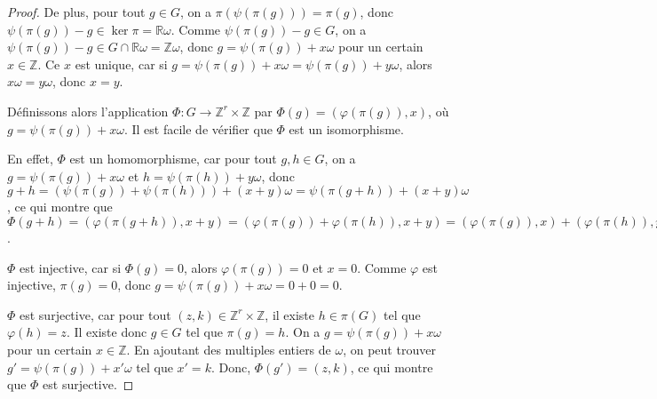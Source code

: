 \documentclass{article}
\newcommand{\R}{\mathbb{R}}
\newcommand{\Z}{\mathbb{Z}}
\begin{document}
\begin{proof}
De plus, pour tout $g \in G$, on a $\pi(\psi(\pi(g))) = \pi(g)$, donc $\psi(\pi(g)) - g \in \ker \pi = \R \omega$. Comme $\psi(\pi(g)) - g \in G$, on a $\psi(\pi(g)) - g \in G \cap \R \omega = \Z \omega$, donc $g = \psi(\pi(g)) + x \omega$ pour un certain $x \in \Z$. Ce $x$ est unique, car si $g = \psi(\pi(g)) + x \omega = \psi(\pi(g)) + y \omega$, alors $x\omega = y\omega$, donc $x = y$.

Définissons alors l'application \( \Phi \colon G \to \Z^r \times \Z \) par \( \Phi(g) = (\varphi(\pi(g)), x) \), où \( g = \psi(\pi(g)) + x \omega \). Il est facile de vérifier que \( \Phi \) est un isomorphisme.

En effet, $\Phi$ est un homomorphisme, car pour tout $g, h \in G$, on a $g = \psi(\pi(g)) + x \omega$ et $h = \psi(\pi(h)) + y \omega$, donc $g + h = (\psi(\pi(g)) + \psi(\pi(h))) + (x + y) \omega = \psi(\pi(g + h)) + (x + y) \omega$, ce qui montre que $\Phi(g + h) = (\varphi(\pi(g + h)), x + y) = (\varphi(\pi(g)) + \varphi(\pi(h)), x + y) = (\varphi(\pi(g)), x) + (\varphi(\pi(h)), y) = \Phi(g) + \Phi(h)$.

$\Phi$ est injective, car si $\Phi(g) = 0$, alors $\varphi(\pi(g)) = 0$ et $x = 0$. Comme $\varphi$ est injective, $\pi(g) = 0$, donc $g = \psi(\pi(g)) + x \omega = 0 + 0 = 0$.

$\Phi$ est surjective, car pour tout $(z, k) \in \Z^r \times \Z$, il existe $h \in \pi(G)$ tel que $\varphi(h) = z$. Il existe donc $g \in G$ tel que $\pi(g) = h$. On a $g = \psi(\pi(g)) + x \omega$ pour un certain $x \in \Z$. En ajoutant des multiples entiers de $\omega$, on peut trouver $g' = \psi(\pi(g)) + x' \omega$ tel que $x' = k$. Donc, $\Phi(g') = (z, k)$, ce qui montre que $\Phi$ est surjective.
\end{proof}
\end{document}
